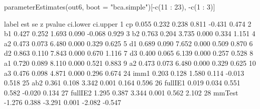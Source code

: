 \begin{Schunk}
\begin{Sinput}
 parameterEstimates(out6, 
                    boot = "bca.simple")[-c(11 : 23), -c(1 : 3)]
\end{Sinput}
\begin{Soutput}
     label    est    se      z pvalue ci.lower ci.upper
1       cp  0.055 0.232  0.238  0.811   -0.431    0.474
2       b1  0.427 0.252  1.693  0.090   -0.068    0.929
3       b2  0.763 0.204  3.735  0.000    0.334    1.151
4       a2  0.473 0.073  6.480  0.000    0.329    0.625
5       d1  0.689 0.090  7.652  0.000    0.509    0.870
6       d2  0.863 0.110  7.843  0.000    0.670    1.116
7       d3  0.400 0.065  6.139  0.000    0.257    0.528
8       a1  0.720 0.089  8.110  0.000    0.521    0.883
9       a2  0.473 0.073  6.480  0.000    0.329    0.625
10      a3  0.476 0.098  4.871  0.000    0.296    0.674
24    imm1  0.203 0.128  1.580  0.114   -0.013    0.518
25     ab2  0.361 0.108  3.342  0.001    0.164    0.596
26 fullIE1  0.019 0.034  0.551  0.582   -0.020    0.134
27 fullIE2  1.295 0.387  3.344  0.001    0.562    2.102
28  mmTest -1.276 0.388 -3.291  0.001   -2.082   -0.547
\end{Soutput}
\end{Schunk}
